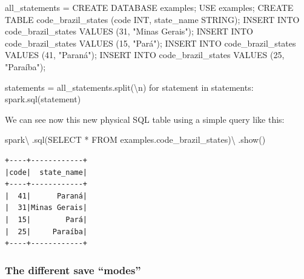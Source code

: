 \documentclass[
  11pt,
  letterpaper,
  DIV=11,
  numbers=noendperiod]{scrreprt}
\newenvironment{Shaded}{\begin{snugshade}}{\end{snugshade}}
\newcommand{\CharTok}[1]{\textcolor[rgb]{0.13,0.47,0.30}{#1}}
\newcommand{\ControlFlowTok}[1]{\textcolor[rgb]{0.00,0.23,0.31}{#1}}
\newcommand{\KeywordTok}[1]{\textcolor[rgb]{0.00,0.23,0.31}{#1}}
\newcommand{\NormalTok}[1]{\textcolor[rgb]{0.00,0.23,0.31}{#1}}
\newcommand{\OperatorTok}[1]{\textcolor[rgb]{0.37,0.37,0.37}{#1}}
\newcommand{\StringTok}[1]{\textcolor[rgb]{0.13,0.47,0.30}{#1}}
\begin{document}
\begin{Shaded}
\begin{Highlighting}[]
\NormalTok{all\_statements }\OperatorTok{=} \StringTok{\textquotesingle{}\textquotesingle{}\textquotesingle{}CREATE DATABASE \textasciigrave{}examples\textasciigrave{};}
\StringTok{USE \textasciigrave{}examples\textasciigrave{};}
\StringTok{CREATE TABLE \textasciigrave{}code\_brazil\_states\textasciigrave{} (\textasciigrave{}code\textasciigrave{} INT, \textasciigrave{}state\_name\textasciigrave{} STRING);}
\StringTok{INSERT INTO \textasciigrave{}code\_brazil\_states\textasciigrave{} VALUES (31, "Minas Gerais");}
\StringTok{INSERT INTO \textasciigrave{}code\_brazil\_states\textasciigrave{} VALUES (15, "Pará");}
\StringTok{INSERT INTO \textasciigrave{}code\_brazil\_states\textasciigrave{} VALUES (41, "Paraná");}
\StringTok{INSERT INTO \textasciigrave{}code\_brazil\_states\textasciigrave{} VALUES (25, "Paraíba");\textquotesingle{}\textquotesingle{}\textquotesingle{}}

\NormalTok{statements }\OperatorTok{=}\NormalTok{ all\_statements.split(}\StringTok{\textquotesingle{}}\CharTok{\textbackslash{}n}\StringTok{\textquotesingle{}}\NormalTok{)}
\ControlFlowTok{for}\NormalTok{ statement }\KeywordTok{in}\NormalTok{ statements:}
\NormalTok{  spark.sql(statement)}
\end{Highlighting}
\end{Shaded}

We can see now this new physical SQL table using a simple query like
this:

\begin{Shaded}
\begin{Highlighting}[]
\NormalTok{spark}\OperatorTok{\textbackslash{}}
\NormalTok{  .sql(}\StringTok{\textquotesingle{}SELECT * FROM examples.code\_brazil\_states\textquotesingle{}}\NormalTok{)}\OperatorTok{\textbackslash{}}
\NormalTok{  .show()}
\end{Highlighting}
\end{Shaded}

\begin{verbatim}
+----+------------+
|code|  state_name|
+----+------------+
|  41|      Paraná|
|  31|Minas Gerais|
|  15|        Pará|
|  25|     Paraíba|
+----+------------+
\end{verbatim}

\hypertarget{sec-sql-save-modes}{%
\subsubsection{The different save ``modes''}\label{sec-sql-save-modes}}
\end{document}
